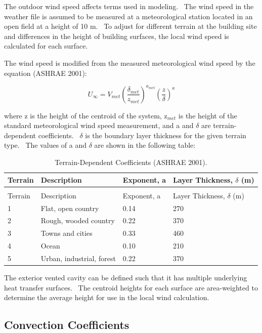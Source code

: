 The outdoor wind speed affects terms used in modeling.~ The wind speed in the weather file is assumed to be measured at a meteorological station located in an open field at a height of 10 m.~ To adjust for different terrain at the building site and differences in the height of building surfaces, the local wind speed is calculated for each surface.

The wind speed is modified from the measured meteorological wind speed by the equation (ASHRAE 2001):

\begin{equation}
{U_\infty } = {V_{met}}{\left( {\frac{{{\delta_{met}}}}{{{z_{met}}}}} \right)^{{a_{met}}}}{\left( {\frac{z}{\delta }} \right)^a}
\end{equation}

where z is the height of the centroid of the system, z\(_{met}\) is the height of the standard meteorological wind speed measurement, and a and $\delta$ are terrain-dependent coefficients.~ $\delta$ is the boundary layer thickness for the given terrain type.~ The values of a and $\delta$ are shown in the following table:

\begin{longtable}[c]{@{}llll@{}}
\caption{Terrain-Dependent Coefficients (ASHRAE 2001). \label{table:terrain-dependent-coefficients-ashrae-2001.}} \tabularnewline
\toprule 
Terrain & Description & Exponent, a & Layer Thickness, $\delta$ (m) \tabularnewline
\midrule
\endfirsthead

\caption[]{Terrain-Dependent Coefficients (ASHRAE 2001).} \tabularnewline
\toprule 
Terrain & Description & Exponent, a & Layer Thickness, $\delta$ (m) \tabularnewline
\midrule
\endhead

1 & Flat, open country & 0.14 & 270 \tabularnewline
2 & Rough, wooded country & 0.22 & 370 \tabularnewline
3 & Towns and cities & 0.33 & 460 \tabularnewline
4 & Ocean & 0.10 & 210 \tabularnewline
5 & Urban, industrial, forest & 0.22 & 370 \tabularnewline
\bottomrule
\end{longtable}

The exterior vented cavity can be defined such that it has multiple underlying heat transfer surfaces.~ The centroid heights for each surface are area-weighted to determine the average height for use in the local wind calculation.

\subsection{Convection Coefficients}\label{convection-coefficients}


